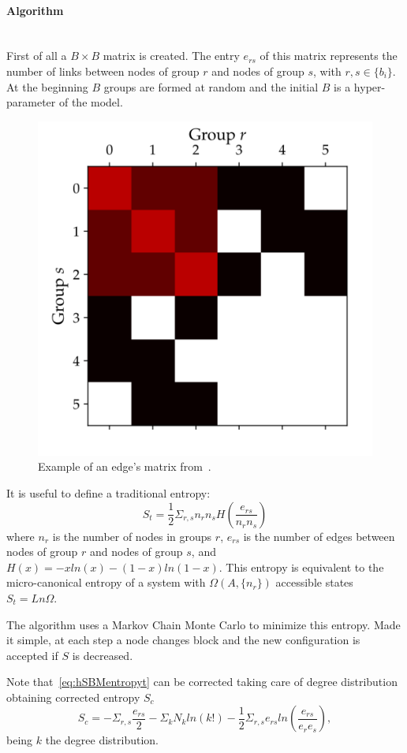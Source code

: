 \paragraph{Algorithm}\mbox{}\\
First of all a $B\times B$ matrix is created. The entry $e_{rs}$ of this matrix represents the number of links between nodes of group $r$ and nodes of group $s$, with $r,s\in\{b_i\}$. At the beginning $B$ groups are formed at random and the initial $B$ is a hyper-parameter of the model.
\begin{figure}[htb!]
  \centering
  \includegraphics[width=0.3\linewidth]{pictures/topic/peixioto_ers.pdf}
  \caption{Example of an edge's matrix from~\cite{peixoto_graph-tool_2014}.}
    \label{fig:hsbm-ers}
\end{figure}

It is useful to define a traditional entropy:
\begin{equation}\label{eq:hSBMentropyt}
  S_t=\frac{1}{2}\Sigma_{r,s} n_rn_sH\left(\frac{e_{rs}}{n_rn_s}\right)
\end{equation}
where $n_{r}$ is the number of nodes in groups $r$, $e_{rs}$ is the number of edges between nodes of group $r$ and nodes of group $s$, and $H(x)=-xln(x)-(1-x)ln(1-x)$. This entropy is equivalent to the micro-canonical entropy of a system with ${\Omega(A,\{n_r\})}$ accessible states $S_t=Ln\Omega$.

The algorithm uses a Markov Chain Monte Carlo to minimize this entropy. Made it simple, at each step a node changes block and the new configuration is accepted if $S$ is decreased.

Note that~\ref{eq:hSBMentropyt} can be corrected taking care of degree distribution obtaining corrected entropy $S_c$
\begin{equation}
  S_c=-\Sigma_{r,s}\frac{e_{rs}}{2}-\Sigma_k
  N_kln(k!)-\frac{1}{2}\Sigma_{r,s}e_{rs}ln\left(\frac{e_{rs}}{e_re_s}\right),
\end{equation}
being $k$ the degree distribution.

